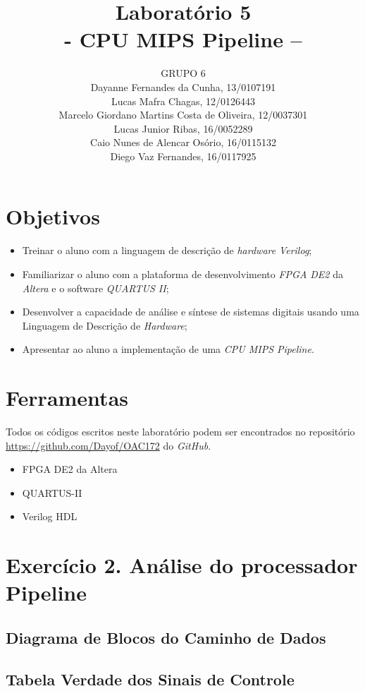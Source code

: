 \documentclass[12pt]{article}
\title{Laboratório 5\\- CPU MIPS Pipeline –}
\author{GRUPO 6\\
	Dayanne Fernandes da Cunha, 13/0107191\\
	Lucas Mafra Chagas, 12/0126443\\
	Marcelo Giordano Martins Costa de Oliveira, 12/0037301\\
	Lucas Junior Ribas, 16/0052289\\
	Caio Nunes de Alencar Osório, 16/0115132\\
	Diego Vaz Fernandes, 16/0117925}
\begin{document}
\maketitle

\section{Objetivos}
\label{sec:Objetivos}

\begin{itemize}
\item Treinar o aluno com a linguagem de descrição de \textit{hardware} \textit{Verilog};
\item Familiarizar o aluno com a plataforma de desenvolvimento \textit{FPGA DE2} da \textit{Altera} e o software \textit{QUARTUS II};
\item Desenvolver a capacidade de análise e síntese de sistemas digitais usando uma Linguagem de Descrição de \textit{Hardware};
\item Apresentar ao aluno a implementação de uma \textit{CPU MIPS Pipeline}.
\end{itemize}

\section{Ferramentas}
\label{sec:Materiais}

Todos os códigos escritos neste laboratório podem ser encontrados no repositório \url{https://github.com/Dayof/OAC172} do \textit{GitHub}.

\begin{itemize}
\item FPGA DE2 da Altera 
\item QUARTUS-II
\item Verilog HDL
\end{itemize}

\section{Exercício 2. Análise do processador Pipeline}
\label{sec:pipeline}

\subsection{Diagrama de Blocos do Caminho de Dados}

\subsection{Tabela Verdade dos Sinais de Controle}
\end{document}

